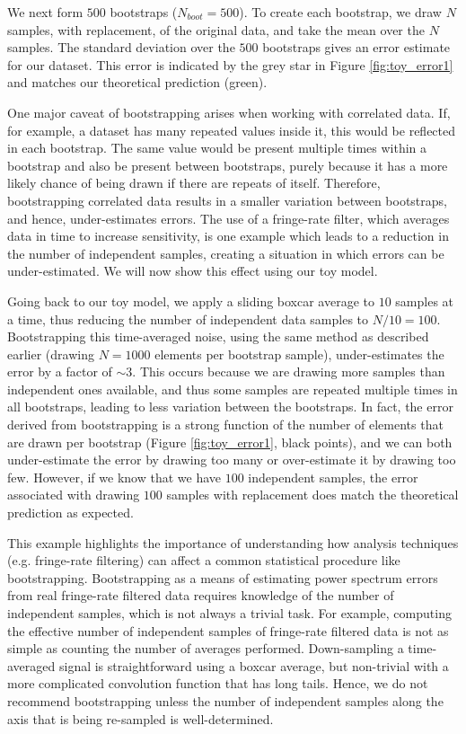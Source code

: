 \documentclass[preprint2,numberedappendix,tighten]{aastex6}  %
\begin{document}
We next form $500$ bootstraps ($N_{boot} = 500$). To create each bootstrap, we draw $N$ samples, with replacement, of the original data, and take the mean over the $N$ samples. The standard deviation over the $500$ bootstraps gives an error estimate for our dataset. This error is indicated by the grey star in Figure \ref{fig:toy_error1} and matches our theoretical prediction (green).

One major caveat of bootstrapping arises when working with correlated data. If, for example, a dataset has many repeated values inside it, this would be reflected in each bootstrap. The same value would be present multiple times within a bootstrap and also be present between bootstraps, purely because it has a more likely chance of being drawn if there are repeats of itself. Therefore, bootstrapping correlated data results in a smaller variation between bootstraps, and hence, under-estimates errors. The use of a fringe-rate filter, which averages data in time to increase sensitivity, is one example which leads to a reduction in the number of independent samples, creating a situation in which errors can be under-estimated. We will now show this effect using our toy model.

Going back to our toy model, we apply a sliding boxcar average to $10$ samples at a time, thus reducing the number of independent data samples to $N/10 = 100$. Bootstrapping this time-averaged noise, using the same method as described earlier (drawing $N=1000$ elements per bootstrap sample), under-estimates the error by a factor of $\sim3$. This occurs because we are drawing more samples than independent ones available, and thus some samples are repeated multiple times in all bootstraps, leading to less variation between the bootstraps. In fact, the error derived from bootstrapping is a strong function of the number of elements that are drawn per bootstrap (Figure \ref{fig:toy_error1}, black points), and we can both under-estimate the error by drawing too many or over-estimate it by drawing too few. However, if we know that we have $100$ independent samples, the error associated with drawing $100$ samples with replacement does match the theoretical prediction as expected.

This example highlights the importance of understanding how analysis techniques (e.g. fringe-rate filtering) can affect a common statistical procedure like bootstrapping. Bootstrapping as a means of estimating power spectrum errors from real fringe-rate filtered data requires knowledge of the number of independent samples, which is not always a trivial task. For example, computing the effective number of independent samples of fringe-rate filtered data is not as simple as counting the number of averages performed. Down-sampling a time-averaged signal is straightforward using a boxcar average, but non-trivial with a more complicated convolution function that has long tails. Hence, we do not recommend bootstrapping unless the number of independent samples along the axis that is being re-sampled is well-determined.
\end{document}
